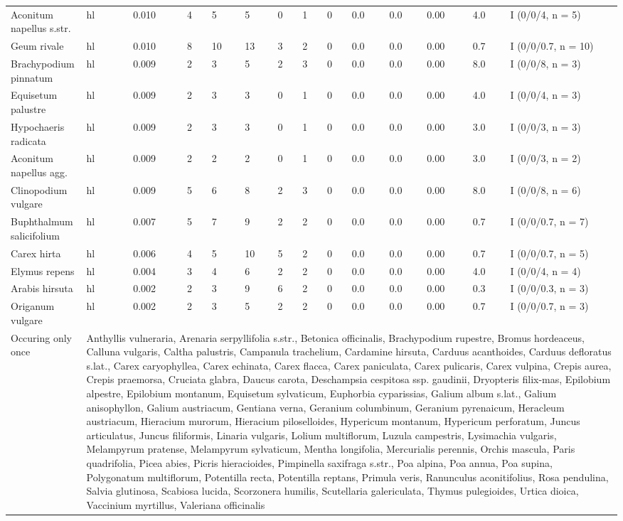 \documentclass[9pt]{article}
\begin{document}
\begin{longtable}{lllllllllllllll}
Aconitum napellus s.str.&hl&&0.010& 4&  5&  5& 0&1&0&0.0&0.0& 0.00& 4.0&I (0/0/4, n = 5)\tabularnewline
Geum rivale&hl&&0.010& 8& 10& 13& 3&2&0&0.0&0.0& 0.00& 0.7&I (0/0/0.7, n = 10)\tabularnewline
Brachypodium pinnatum&hl&&0.009& 2&  3&  5& 2&3&0&0.0&0.0& 0.00& 8.0&I (0/0/8, n = 3)\tabularnewline
Equisetum palustre&hl&&0.009& 2&  3&  3& 0&1&0&0.0&0.0& 0.00& 4.0&I (0/0/4, n = 3)\tabularnewline
Hypochaeris radicata&hl&&0.009& 2&  3&  3& 0&1&0&0.0&0.0& 0.00& 3.0&I (0/0/3, n = 3)\tabularnewline
Aconitum napellus agg.&hl&&0.009& 2&  2&  2& 0&1&0&0.0&0.0& 0.00& 3.0&I (0/0/3, n = 2)\tabularnewline
Clinopodium vulgare&hl&&0.009& 5&  6&  8& 2&3&0&0.0&0.0& 0.00& 8.0&I (0/0/8, n = 6)\tabularnewline
Buphthalmum salicifolium&hl&&0.007& 5&  7&  9& 2&2&0&0.0&0.0& 0.00& 0.7&I (0/0/0.7, n = 7)\tabularnewline
Carex hirta&hl&&0.006& 4&  5& 10& 5&2&0&0.0&0.0& 0.00& 0.7&I (0/0/0.7, n = 5)\tabularnewline
Elymus repens&hl&&0.004& 3&  4&  6& 2&2&0&0.0&0.0& 0.00& 4.0&I (0/0/4, n = 4)\tabularnewline
Arabis hirsuta&hl&&0.002& 2&  3&  9& 6&2&0&0.0&0.0& 0.00& 0.3&I (0/0/0.3, n = 3)\tabularnewline
Origanum vulgare&hl&&0.002& 2&  3&  5& 2&2&0&0.0&0.0& 0.00& 0.7&I (0/0/0.7, n = 3)\tabularnewline
\midrule
Occuring only once& \multicolumn{14}{p{150mm}}{Anthyllis vulneraria, Arenaria serpyllifolia s.str., Betonica officinalis, Brachypodium rupestre, Bromus hordeaceus, Calluna vulgaris, Caltha palustris, Campanula trachelium, Cardamine hirsuta, Carduus acanthoides, Carduus defloratus s.lat., Carex caryophyllea, Carex echinata, Carex flacca, Carex paniculata, Carex pulicaris, Carex vulpina, Crepis aurea, Crepis praemorsa, Cruciata glabra, Daucus carota, Deschampsia cespitosa ssp. gaudinii, Dryopteris filix-mas, Epilobium alpestre, Epilobium montanum, Equisetum sylvaticum, Euphorbia cyparissias, Galium album s.lat., Galium anisophyllon, Galium austriacum, Gentiana verna, Geranium columbinum, Geranium pyrenaicum, Heracleum austriacum, Hieracium murorum, Hieracium piloselloides, Hypericum montanum, Hypericum perforatum, Juncus articulatus, Juncus filiformis, Linaria vulgaris, Lolium multiflorum, Luzula campestris, Lysimachia vulgaris, Melampyrum pratense, Melampyrum sylvaticum, Mentha longifolia, Mercurialis perennis, Orchis mascula, Paris quadrifolia, Picea abies, Picris hieracioides, Pimpinella saxifraga s.str., Poa alpina, Poa annua, Poa supina, Polygonatum multiflorum, Potentilla recta, Potentilla reptans, Primula veris, Ranunculus aconitifolius, Rosa pendulina, Salvia glutinosa, Scabiosa lucida, Scorzonera humilis, Scutellaria galericulata, Thymus pulegioides, Urtica dioica, Vaccinium myrtillus, Valeriana officinalis}\tabularnewline

\end{longtable}
\end{document}
